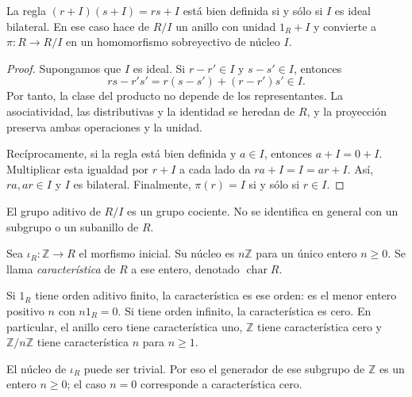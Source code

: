 \begin{prop}\label{prop:C12-cociente}
La regla $(r+I)(s+I)=rs+I$ está bien definida si y sólo si $I$ es ideal bilateral. En ese caso hace de $R/I$ un anillo con unidad $1_R+I$ y convierte a $\pi:R\to R/I$ en un homomorfismo sobreyectivo de núcleo $I$.
\end{prop}
\begin{proof}
Supongamos que $I$ es ideal. Si $r-r'\in I$ y $s-s'\in I$, entonces
\[
rs-r's'=r(s-s')+(r-r')s'\in I.
\]
Por tanto, la clase del producto no depende de los representantes. La asociatividad, las distributivas y la identidad se heredan de $R$, y la proyección preserva ambas operaciones y la unidad.

Recíprocamente, si la regla está bien definida y $a\in I$, entonces $a+I=0+I$. Multiplicar esta igualdad por $r+I$ a cada lado da $ra+I=I=ar+I$. Así, $ra,ar\in I$ y $I$ es bilateral. Finalmente, $\pi(r)=I$ si y sólo si $r\in I$.
\end{proof}
\begin{obs}
El grupo aditivo de $R/I$ es un grupo cociente. No se identifica en general con un subgrupo o un subanillo de $R$.
\end{obs}

\begin{defi}
Sea $\iota_R:\mathbb Z\to R$ el morfismo inicial. Su núcleo es $n\mathbb Z$ para un único entero $n\geq0$. Se llama \emph{característica} de $R$ a ese entero, denotado $\operatorname{char}R$.
\end{defi}
Si $1_R$ tiene orden aditivo finito, la característica es ese orden: es el menor entero positivo $n$ con $n1_R=0$. Si tiene orden infinito, la característica es cero. En particular, el anillo cero tiene característica uno, $\mathbb Z$ tiene característica cero y $\mathbb Z/n\mathbb Z$ tiene característica $n$ para $n\geq1$.
\begin{obs}
El núcleo de $\iota_R$ puede ser trivial. Por eso el generador de ese subgrupo de $\mathbb Z$ es un entero $n\geq0$; el caso $n=0$ corresponde a característica cero.
\end{obs}

